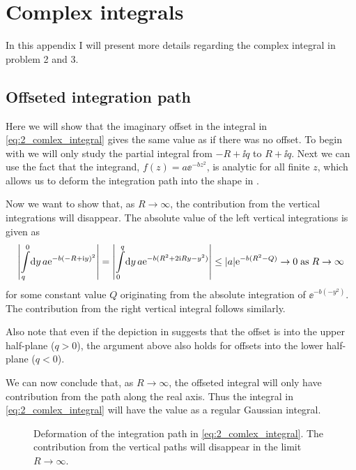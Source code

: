 \documentclass[11pt,letter, swedish, english
]{article}
\renewcommand{\thesubsection}{\arabic{section} (\alph{subsection})}
\begin{document}
\newpage
\appendix
\renewcommand{\thesubsection}{\Alph{section}.\arabic{subsection}}
\section{Complex integrals}
In this appendix I will present more details regarding the complex
integral in problem 2 and 3. 

\subsection{Offseted integration path}\label{sec:offset}
Here we will show that the  imaginary offset in the integral in
\eqref{eq:2_comlex_integral} gives the same value as if there was no
offset. To begin with we will only study the partial integral from
$-R+\ii q$ to $R+\ii q$. Next we can use the fact that the
integrand, $f(z)=a\ee^{-bz^2}$, is analytic for all finite $z$, which
allows us to deform the integration path into the shape in
.

Now we want to show that, as $R\to\infty$, the contribution from the
vertical integrations will disappear. The absolute value of the
left vertical integrations is given as
\begin{equation}
\abs{\int_{q}^0\!\rd{y}\,a\ee^{-b(-R+\ii y)^2}}
=\abs{\int_{0}^q\!\rd{y}\,a\ee^{-b(R^2+2\ii Ry - y^2)}}
\le\abs{a}\ee^{-b(R^2-Q)}\to0\;\text{as}\;R\to\infty
\end{equation}
for some constant value $Q$ originating from the absolute integration
of $\ee^{-b(-y^2)}$. The contribution from the right vertical integral
follows similarly. 

Also note that even if the depiction in 
suggests that the offset is into the upper half-plane ($q>0$), the argument
above also holds for offsets into the lower half-plane ($q<0$).

We can now conclude that, as $R\to\infty$, the offseted integral will
only have contribution from the path along the real axis. Thus the
integral in \eqref{eq:2_comlex_integral} will have the value as a
regular Gaussian integral.

\begin{figure}\centering
\resizebox{.5\textwidth}{!}{}
\caption{Deformation of the integration path in
  \eqref{eq:2_comlex_integral}. The contribution from the vertical
  paths will disappear in the limit $R\to\infty$.}
\label{fig:int_path_2}
\end{figure}
\end{document}
